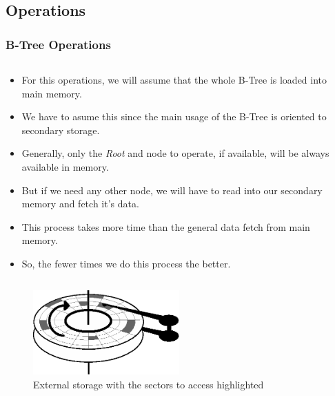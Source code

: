\documentclass{beamer}
\begin{document}
\begin{frame}
    \subsection{Operations}
    \frametitle{B-Tree Operations}
    \begin{columns}
        \begin{column}{\textlecolumn}
            \begin{block}{}
                \begin{itemize}
                    \item For this operations, we will assume that the whole B-Tree is loaded into main memory.
                    \item We have to asume this since the main usage of the B-Tree is oriented to secondary storage.
                    \item Generally, only the \emph{Root} and node to operate, if available, will be always available in memory.
                    \item But if we need any other node, we will have to read into our secondary memory and fetch it's data.
                    \item This process takes more time than the general data fetch from main memory.
                    \item So, the fewer times we do this process the better.
                \end{itemize}
            \end{block}
        \end{column}
        \begin{column}{\textricolumn}
        \end{column}
    \end{columns}
    \begin{figure}[h!]
        \includegraphics[width=0.5\textwidth]{resources/made/external_storage_wblocks.eps}
        \caption{External storage with the sectors to access highlighted}
    \end{figure}
\end{frame}
\end{document}

